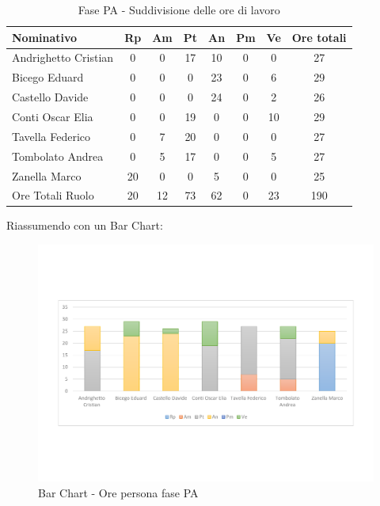 \documentclass[../PianoProgetto.tex]{subfiles}
\begin{document}
	\begin{table}[h]
		\centering
	
		\begin{tabularx}{\textwidth}{l  * {6}{C}  c}
			\toprule
			\textbf{Nominativo} & \textbf{Rp} & \textbf{Am} & \textbf{Pt} 
						& \textbf{An} & \textbf{Pm} & \textbf{Ve} & \textbf{Ore totali} \\
			\midrule
			Andrighetto Cristian & 0 & 0 &	17 & 10 & 0 & 0 & 27 \\
			Bicego Eduard & 0 & 0 & 0 & 23 & 0 & 6 & 29 \\
			Castello Davide & 0 & 0 & 0 & 24 & 0 & 2 & 26 \\
			Conti Oscar Elia & 0 & 0 &	19 & 0 & 0 & 10 & 29 \\
			Tavella Federico &	0 & 7 & 20 & 0 & 0 & 0 & 27 \\
			Tombolato Andrea & 0 & 5 &	17 & 0 & 0 & 5 & 27 \\
			Zanella Marco & 20 & 0 & 0 & 5 & 0 & 0 & 25 \\
			\midrule			
			Ore Totali Ruolo & 20 & 12 & 73 & 62 & 0 & 23 & 190 \\
			\bottomrule
			
		\end{tabularx}
		\caption{Fase PA - Suddivisione delle ore di lavoro}
		\label{tab:fasePA_ore}
	\end{table}
\vfill	
	Riassumendo con un Bar Chart:	
	
	\begin{figure}[!h]
		\centering
		\includegraphics[width=\textwidth , trim=2cm 5cm 2cm 5cm]{grafici/PA/PA-ore-persona}
			\caption{Bar Chart - Ore persona fase PA}
		\label{fig:BarChart-fasePA_ore}
	\end{figure}
\vfill	
\newpage
	
\end{document}
